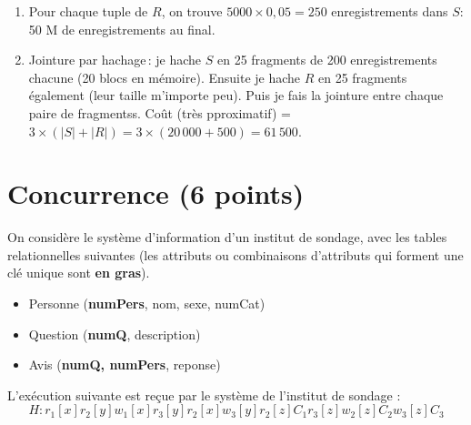 \begin{solution}
\begin{enumerate}
   \item Pour chaque tuple de $R$, on trouve $5000 \times 0,05 = 250$
    enregistrements dans $S$: 50 M de enregistrements au final.

   \item Jointure par hachage\,: je hache $S$ en 25 fragments de 
   200 enregistrements chacune (20 blocs en mémoire). Ensuite je hache $R$ en 25
   fragments également (leur taille m'importe peu). Puis je fais la jointure
   entre chaque paire de fragmentss. Coût (très 	pproximatif) =
   $3 \times (|S| + |R|) = 3 \times (20\,000 + 500) = 61\,500$.
 
 \end{enumerate}
\end{solution}



\section{Concurrence (6 points)}

On considère le système d'information
d'un institut de sondage, avec les tables relationnelles 
suivantes (les attributs ou combinaisons d'attributs qui forment 
une clé unique sont \textbf{en gras}).

\begin{itemize}
  \item  Personne (\textbf{numPers}, nom, sexe, numCat)
  \item Question (\textbf{numQ}, description)
  \item  Avis (\textbf{numQ, numPers}, reponse)
\end{itemize}


L'exécution suivante est reçue par le système de l'institut de sondage :
$$H : r_1[x] r_2[y] w_1[x] r_3[y]  r_2[x] w_3[y] r_2[z] C_1 r_3[z] w_2[z] C_2 w_3[z] C_3$$


